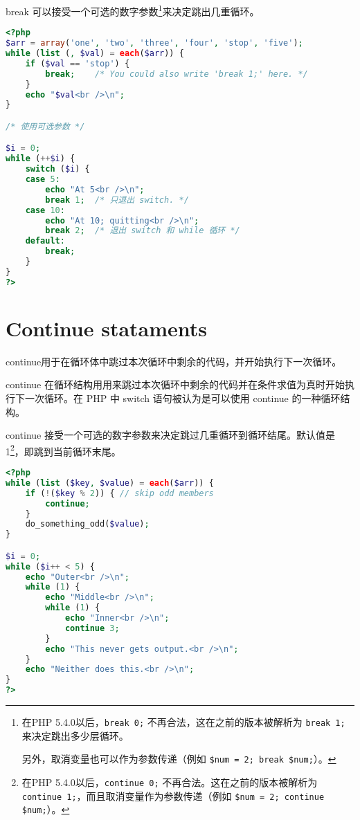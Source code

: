 break 可以接受一个可选的数字参数\footnote{在PHP 5.4.0以后，\texttt{break 0;} 不再合法，这在之前的版本被解析为 \texttt{break 1;}来决定跳出多少层循环。

另外，取消变量也可以作为参数传递（例如 \texttt{\$num = 2; break \$num;}）。}来决定跳出几重循环。


\begin{lstlisting}[language=PHP]
<?php
$arr = array('one', 'two', 'three', 'four', 'stop', 'five');
while (list (, $val) = each($arr)) {
    if ($val == 'stop') {
        break;    /* You could also write 'break 1;' here. */
    }
    echo "$val<br />\n";
}

/* 使用可选参数 */

$i = 0;
while (++$i) {
    switch ($i) {
    case 5:
        echo "At 5<br />\n";
        break 1;  /* 只退出 switch. */
    case 10:
        echo "At 10; quitting<br />\n";
        break 2;  /* 退出 switch 和 while 循环 */
    default:
        break;
    }
}
?>
\end{lstlisting}






\section{Continue stataments}


continue用于在循环体中跳过本次循环中剩余的代码，并开始执行下一次循环。



continue 在循环结构用用来跳过本次循环中剩余的代码并在条件求值为真时开始执行下一次循环。在 PHP 中 switch 语句被认为是可以使用 continue 的一种循环结构。

continue 接受一个可选的数字参数来决定跳过几重循环到循环结尾。默认值是 1\footnote{在PHP 5.4.0以后，\texttt{continue 0;} 不再合法。这在之前的版本被解析为 \texttt{continue 1;}，而且取消变量作为参数传递（例如 \texttt{\$num = 2; continue \$num;}）。}，即跳到当前循环末尾。

\begin{lstlisting}[language=PHP]
<?php
while (list ($key, $value) = each($arr)) {
    if (!($key % 2)) { // skip odd members
        continue;
    }
    do_something_odd($value);
}

$i = 0;
while ($i++ < 5) {
    echo "Outer<br />\n";
    while (1) {
        echo "Middle<br />\n";
        while (1) {
            echo "Inner<br />\n";
            continue 3;
        }
        echo "This never gets output.<br />\n";
    }
    echo "Neither does this.<br />\n";
}
?>
\end{lstlisting}

